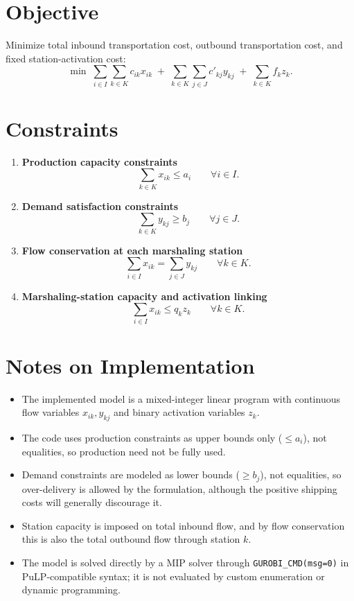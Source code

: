 \section*{Objective}

Minimize total inbound transportation cost, outbound transportation cost, and fixed station-activation cost:
\[
\min \;
\sum_{i \in I}\sum_{k \in K} c_{ik} x_{ik}
\;+\;
\sum_{k \in K}\sum_{j \in J} c'_{kj} y_{kj}
\;+\;
\sum_{k \in K} f_k z_k.
\]

\section*{Constraints}

\begin{enumerate}
    \item \textbf{Production capacity constraints}
    \[
    \sum_{k \in K} x_{ik} \le a_i
    \qquad \forall i \in I.
    \]

    \item \textbf{Demand satisfaction constraints}
    \[
    \sum_{k \in K} y_{kj} \ge b_j
    \qquad \forall j \in J.
    \]

    \item \textbf{Flow conservation at each marshaling station}
    \[
    \sum_{i \in I} x_{ik}
    =
    \sum_{j \in J} y_{kj}
    \qquad \forall k \in K.
    \]

    \item \textbf{Marshaling-station capacity and activation linking}
    \[
    \sum_{i \in I} x_{ik} \le q_k z_k
    \qquad \forall k \in K.
    \]
\end{enumerate}

\section*{Notes on Implementation}

\begin{itemize}
    \item The implemented model is a mixed-integer linear program with continuous flow variables $x_{ik}, y_{kj}$ and binary activation variables $z_k$.
    \item The code uses production constraints as upper bounds only ($\le a_i$), not equalities, so production need not be fully used.
    \item Demand constraints are modeled as lower bounds ($\ge b_j$), not equalities, so over-delivery is allowed by the formulation, although the positive shipping costs will generally discourage it.
    \item Station capacity is imposed on total inbound flow, and by flow conservation this is also the total outbound flow through station $k$.
    \item The model is solved directly by a MIP solver through \texttt{GUROBI\_CMD(msg=0)} in PuLP-compatible syntax; it is not evaluated by custom enumeration or dynamic programming.
\end{itemize}
